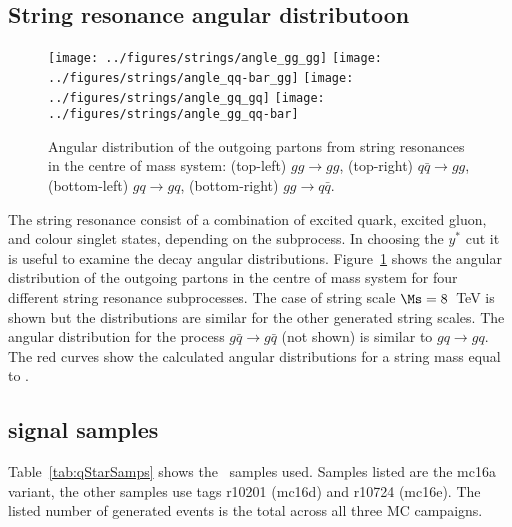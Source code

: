 \subsection{String resonance angular distributoon}

\begin{figure}[htb]
\begin{center}
\texttt{[image: ../figures/strings/angle\_gg\_gg]}
\texttt{[image: ../figures/strings/angle\_qq-bar\_gg]}
\texttt{[image: ../figures/strings/angle\_gq\_gq]}
\texttt{[image: ../figures/strings/angle\_gg\_qq-bar]}
\end{center}
\caption{Angular distribution of the outgoing partons from string
resonances in the centre of mass system:
(top-left) $gg\to gg$,
(top-right) $q\bar{q}\to gg$,
(bottom-left) $gq\to gq$,
(bottom-right) $gg\to q\bar{q}$.}
\label{fig:stringangle}
\end{figure}

The string resonance consist of a combination of excited quark, excited
gluon, and colour singlet states, depending on the subprocess.
In choosing the $y^*$ cut it is useful to examine the decay angular
distributions.
Figure~\ref{fig:stringangle} shows the angular distribution of the outgoing partons
in the centre of mass system for four different string resonance
subprocesses.
The case of string scale $\Ms = 8$~TeV is shown but the distributions
are similar for the other generated string scales.
The angular distribution for the process $g\bar{q}\to g\bar{q}$ (not
shown) is similar to $gq\to gq$.
The red curves show the calculated angular distributions for a string
mass equal to \Ms.


\subsection{\qstar signal samples}
\label{section:MCqStarSamples}

Table~\ref{tab:qStarSamps} shows the \qstar~samples used. Samples listed are the mc16a variant, the other samples use tags r10201 (mc16d) and r10724 (mc16e). The listed number of generated events is the total across all three MC campaigns.

